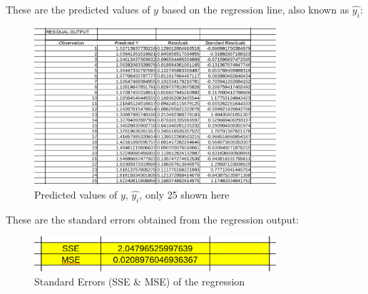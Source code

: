 \clearpage

These are the predicted values of $y$ based on the regression line, also known as $\widehat{y_i}$:

\begin{figure}[H]
	\centering
	\includegraphics[width=0.8\textwidth]{Images/Q2_2.png}
	\caption{Predicted values of $y$, $\widehat{y_i}$, only 25 shown here}
	\label{fig:Q2_2}
\end{figure}

These are the standard errors obtained from the regression output:

\begin{figure}[H]
	\centering
	\includegraphics[width=0.8\textwidth]{Images/Q2_3.png}
	\caption{Standard Errors (SSE \& MSE) of the regression}
	\label{fig:Q2_3}
\end{figure}

\clearpage


